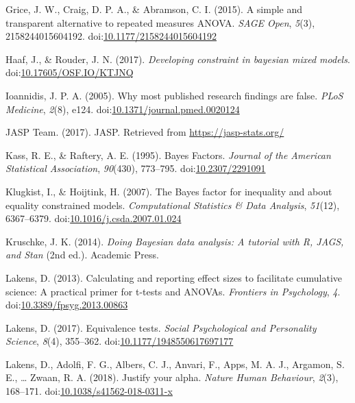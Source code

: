 \documentclass[,man, mask]{apa6}
\theoremstyle{definition}
\theoremstyle{definition}
\theoremstyle{definition}
\theoremstyle{remark}
\begin{document}
\hypertarget{ref-Grice2015}{}
Grice, J. W., Craig, D. P. A., \& Abramson, C. I. (2015). A simple and
transparent alternative to repeated measures ANOVA. \emph{SAGE Open},
\emph{5}(3), 2158244015604192.
doi:\href{https://doi.org/10.1177/2158244015604192}{10.1177/2158244015604192}

\hypertarget{ref-Haaf2017}{}
Haaf, J., \& Rouder, J. N. (2017). \emph{Developing constraint in
bayesian mixed models}.
doi:\href{https://doi.org/10.17605/OSF.IO/KTJNQ}{10.17605/OSF.IO/KTJNQ}

\hypertarget{ref-Ioannidis2005}{}
Ioannidis, J. P. A. (2005). Why most published research findings are
false. \emph{PLoS Medicine}, \emph{2}(8), e124.
doi:\href{https://doi.org/10.1371/journal.pmed.0020124}{10.1371/journal.pmed.0020124}

\hypertarget{ref-JASPTeam2017}{}
JASP Team. (2017). JASP. Retrieved from \url{https://jasp-stats.org/}

\hypertarget{ref-Kass1995}{}
Kass, R. E., \& Raftery, A. E. (1995). Bayes Factors. \emph{Journal of
the American Statistical Association}, \emph{90}(430), 773--795.
doi:\href{https://doi.org/10.2307/2291091}{10.2307/2291091}

\hypertarget{ref-Klugkist2007}{}
Klugkist, I., \& Hoijtink, H. (2007). The Bayes factor for inequality
and about equality constrained models. \emph{Computational Statistics \&
Data Analysis}, \emph{51}(12), 6367--6379.
doi:\href{https://doi.org/10.1016/j.csda.2007.01.024}{10.1016/j.csda.2007.01.024}

\hypertarget{ref-Kruschke2014}{}
Kruschke, J. K. (2014). \emph{Doing Bayesian data analysis: A tutorial
with R, JAGS, and Stan} (2nd ed.). Academic Press.

\hypertarget{ref-Lakens2013}{}
Lakens, D. (2013). Calculating and reporting effect sizes to facilitate
cumulative science: A practical primer for t-tests and ANOVAs.
\emph{Frontiers in Psychology}, \emph{4}.
doi:\href{https://doi.org/10.3389/fpsyg.2013.00863}{10.3389/fpsyg.2013.00863}

\hypertarget{ref-Lakens2017a}{}
Lakens, D. (2017). Equivalence tests. \emph{Social Psychological and
Personality Science}, \emph{8}(4), 355--362.
doi:\href{https://doi.org/10.1177/1948550617697177}{10.1177/1948550617697177}

\hypertarget{ref-Lakens2017}{}
Lakens, D., Adolfi, F. G., Albers, C. J., Anvari, F., Apps, M. A. J.,
Argamon, S. E., \ldots{} Zwaan, R. A. (2018). Justify your alpha.
\emph{Nature Human Behaviour}, \emph{2}(3), 168--171.
doi:\href{https://doi.org/10.1038/s41562-018-0311-x}{10.1038/s41562-018-0311-x}
\end{document}
